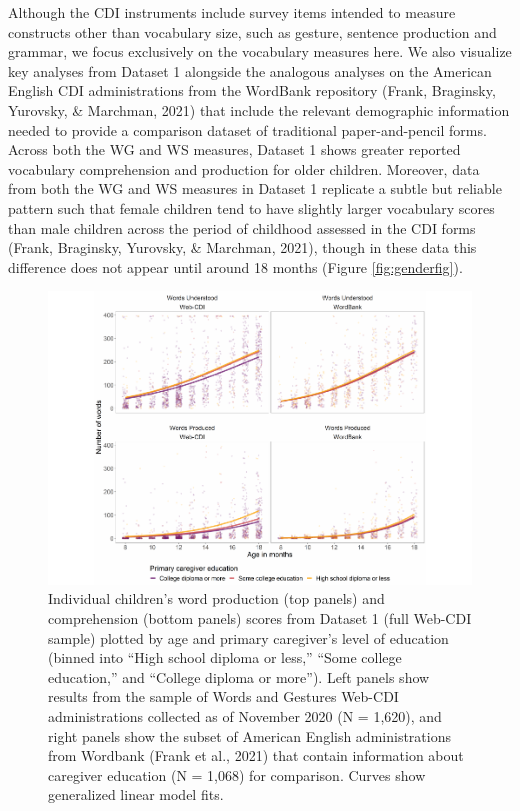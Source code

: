 \documentclass[
  english,
  ,man,floatsintext]{apa6}
\begin{document}
Although the CDI instruments include survey items intended to measure constructs other than vocabulary size, such as gesture, sentence production and grammar, we focus exclusively on the vocabulary measures here. We also visualize key analyses from Dataset 1 alongside the analogous analyses on the American English CDI administrations from the WordBank repository (Frank, Braginsky, Yurovsky, \& Marchman, 2021) that include the relevant demographic information needed to provide a comparison dataset of traditional paper-and-pencil forms. Across both the WG and WS measures, Dataset 1 shows greater reported vocabulary comprehension and production for older children. Moreover, data from both the WG and WS measures in Dataset 1 replicate a subtle but reliable pattern such that female children tend to have slightly larger vocabulary scores than male children across the period of childhood assessed in the CDI forms (Frank, Braginsky, Yurovsky, \& Marchman, 2021), though in these data this difference does not appear until around 18 months (Figure \ref{fig:genderfig}).

\begin{figure}
\centering
\includegraphics{webcdi_paper_files/figure-latex/wgglm-1.pdf}
\caption{\label{fig:wgglm}Individual children's word production (top panels) and comprehension (bottom panels) scores from Dataset 1 (full Web-CDI sample) plotted by age and primary caregiver's level of education (binned into ``High school diploma or less,'' ``Some college education,'' and ``College diploma or more''). Left panels show results from the sample of Words and Gestures Web-CDI administrations collected as of November 2020 (N = 1,620), and right panels show the subset of American English administrations from Wordbank (Frank et al., 2021) that contain information about caregiver education (N = 1,068) for comparison. Curves show generalized linear model fits.}
\end{figure}
\end{document}
